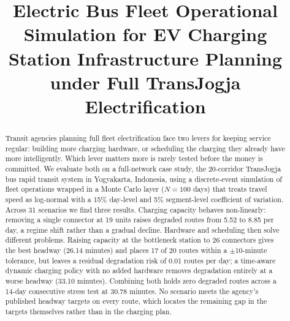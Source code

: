 \documentclass[conference]{IEEEtran}
\begin{document}
\title{Electric Bus Fleet Operational Simulation for EV Charging Station
Infrastructure Planning under Full TransJogja Electrification\\
}

\author{
\and
{}
}

\maketitle

\begin{abstract}
Transit agencies planning full fleet electrification face two levers for
keeping service regular: building more charging hardware, or scheduling
the charging they already have more intelligently. Which lever matters
more is rarely tested before the money is committed. We evaluate both on
a full-network case study, the 20-corridor TransJogja bus rapid transit
system in Yogyakarta, Indonesia, using a discrete-event simulation of
fleet operations wrapped in a Monte Carlo layer ($N=100$ days) that
treats travel speed as log-normal with a 15\% day-level and 5\%
segment-level coefficient of variation. Across 31 scenarios we find
three results. Charging capacity behaves non-linearly: removing a single
connector at 19 units raises degraded routes from 5.52 to 8.85 per day,
a regime shift rather than a gradual decline. Hardware and scheduling
then solve different problems. Raising capacity at the bottleneck
station to 26 connectors gives the best headway (26.14 minutes) and
places 17 of 20 routes within a $\pm$10-minute tolerance, but leaves a
residual degradation risk of 0.01 routes per day; a time-aware dynamic
charging policy with no added hardware removes degradation entirely at a
worse headway (33.10 minutes). Combining both holds zero degraded routes
across a 14-day consecutive stress test at 30.78 minutes. No scenario
meets the agency's published headway targets on every route, which
locates the remaining gap in the targets themselves rather than in the
charging plan.
\end{abstract}
\end{document}
